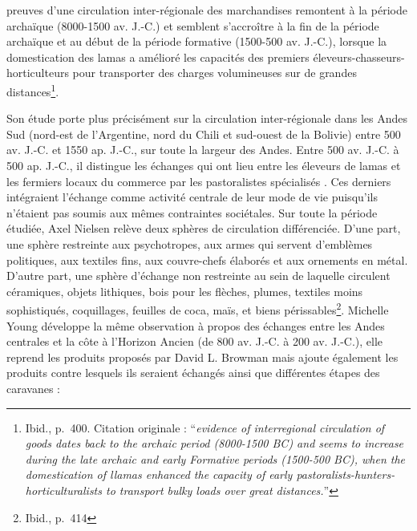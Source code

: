 \begin{citer}
	[Les] preuves d'une circulation inter-régionale des marchandises remontent à la période archaïque (8000-1500 av. J.-C.) et semblent s'accroître à la fin de la période archaïque et au début de la période formative (1500-500 av. J.-C.), lorsque la domestication des lamas a amélioré les capacités des premiers éleveurs-chasseurs-horticulteurs pour transporter des charges volumineuses sur de grandes distances\footnote{Ibid., p.~400. Citation originale : \textquotedblleft \textit{evidence of interregional circulation of goods dates back to the archaic period (8000-1500 BC) and seems to increase during the late archaic and early Formative periods (1500-500 BC), when the domestication of llamas enhanced the capacity of early pastoralists-hunters-horticulturalists to transport bulky loads over great distances.}\textquotedblright}.
	\end{citer}

\noindent Son étude porte plus précisément sur la circulation inter-régionale dans les Andes Sud (nord-est de l'Argentine, nord du Chili et sud-ouest de la Bolivie) entre 500  av. J.-C. et 1550 ap. J.-C., sur toute la largeur des Andes. Entre 500  av. J.-C. à 500 ap. J.-C., il distingue les échanges qui ont lieu entre les éleveurs de lamas et les fermiers locaux du commerce par les \og pastoralistes spécialisés \fg. Ces derniers intégraient l'échange comme activité centrale de leur mode de vie puisqu'ils n'étaient pas soumis aux mêmes contraintes sociétales. Sur toute la période étudiée, Axel Nielsen relève deux sphères de circulation différenciée. D'une part, une sphère restreinte aux psychotropes, aux armes qui servent d'emblèmes politiques, aux textiles fins, aux couvre-chefs élaborés et aux ornements en métal. D'autre part, une sphère d'échange non restreinte au sein de laquelle circulent céramiques, objets lithiques, bois pour les flèches, plumes, textiles moins sophistiqués, coquillages, feuilles de coca, maïs, et biens périssables\footnote{Ibid., p.~414}. Michelle Young développe la même observation à propos des échanges entre les Andes centrales et la côte à l'Horizon Ancien (de 800  av. J.-C. à 200  av. J.-C.), elle reprend les produits proposés par David L. Browman mais ajoute également les produits contre lesquels ils seraient échangés ainsi que différentes étapes des caravanes : 

